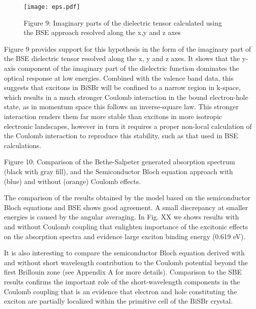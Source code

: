 \documentclass[prb,showpacs,superscriptaddress,titlepage,amsmath,amssymb,twocolumn]{revtex4-1}
\begin{document}
\begin{figure}[!t]
    \centering
    \texttt{[image: eps.pdf]}
    \caption{Figure 9: Imaginary parts of the dielectric tensor calculated using the BSE approach resolved along the x,y and z axes }
    \label{fig:bs}
\end{figure}

Figure 9 provides support for this hypothesis in the form of the imaginary part of the BSE dielectric tensor resolved along the x, y and z axes. It shows that the y-axis component of the imaginary part of the dielectric function dominates the optical response at low energies. Combined with the valence band data, this suggests that excitons in BiSBr will be confined to a narrow region in k-space, which results in a much stronger Coulomb interaction in the bound electron-hole state, as in momentum space this follows an inverse-square law. This stronger interaction renders them far more stable than excitons in more isotropic electronic landscapes, however in turn it requires a proper non-local calculation of the Coulomb interaction to reproduce this stability, such as that used in BSE calculations.

Figure 10: Comparison of the Bethe-Salpeter generated absorption spectrum (black with gray fill), and the Semiconductor Bloch equation approach with (blue) and without (orange) Coulomb effects.

{\color{red} The comparison of the results obtained by the model based on the semiconductor Bloch equations and BSE shows good agreement. A small discrepancy at smaller energies is caused by the angular averaging. In Fig. XX we shows results with and without Coulomb coupling that enlighten importance of the excitonic effects on the absorption spectra and evidence large exciton binding energy (0.619 eV).

It is also interesting to compare the semiconductor Bloch equation derived with and without short wavelength contribution to the Coulomb potential beyond the first Brillouin zone (see Appendix A for more details). Comparison to the SBE results confirms the important role of the short-wavelength components in the Coulomb coupling that is an evidence that electron and hole constituting the exciton are partially localized within the primitive cell of the BiSBr crystal.}




\end{document}

